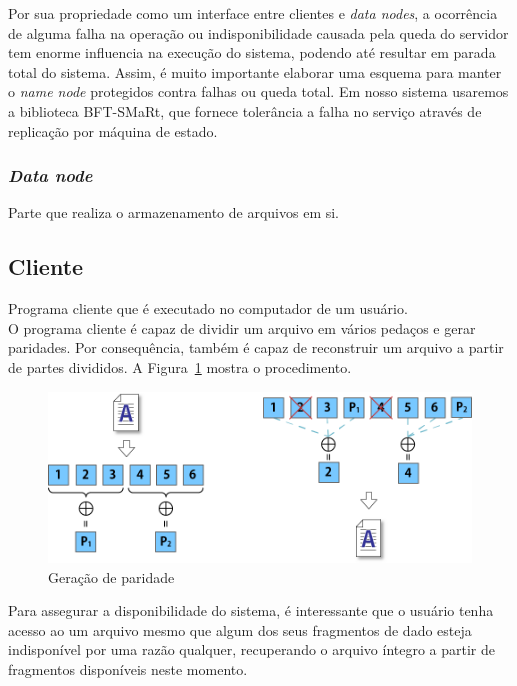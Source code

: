 	Por sua propriedade como um interface entre clientes e \textit{data nodes}, a ocorrência de alguma falha na operação ou indisponibilidade causada pela queda do servidor tem  enorme influencia na execução do sistema, podendo até resultar em parada total do sistema. Assim, é muito importante elaborar uma esquema para manter o \textit{name node} protegidos contra falhas ou queda total. Em nosso sistema usaremos a biblioteca BFT-SMaRt, que fornece tolerância a falha no serviço através de replicação por máquina de estado. 
	
	\subsubsection{\textit{Data node}}
	
	Parte que realiza o armazenamento de arquivos em si.
	
	\subsection{Cliente}
	Programa cliente que é executado no computador de um usuário. 
	\\
	
	O programa cliente é capaz de dividir um arquivo em vários pedaços e gerar paridades. Por consequência, também é capaz de reconstruir um arquivo a partir de partes divididos. A Figura~\ref{fig:img6} mostra o procedimento.
	\begin{figure}[htb]
		\begin{center}
			
			\includegraphics[clip,width=15.0cm]{images/image6.png}
			\caption{Geração de paridade}
			\label{fig:img6}
		\end{center}
	\end{figure}
	
	Para assegurar a disponibilidade do sistema, é interessante que o usuário tenha acesso ao um arquivo mesmo que algum dos seus fragmentos de dado esteja indisponível por uma razão qualquer, recuperando o arquivo íntegro a partir de fragmentos disponíveis neste momento.\\
	
